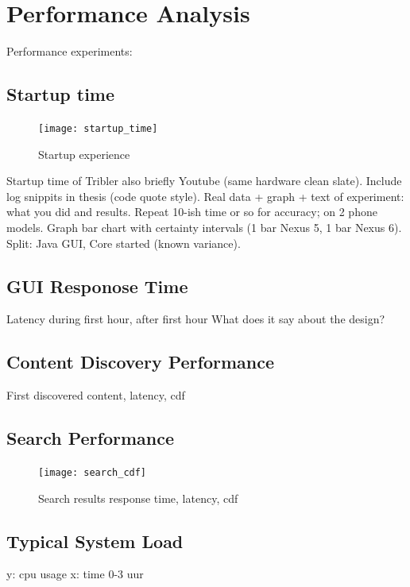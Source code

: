 \chapter{Performance Analysis}
Performance experiments:


\section{Startup time}

\begin{figure}[h]
	\centering
	\texttt{[image: startup\_time]}
	\caption{Startup experience}
	\label{fig:startup_time}
\end{figure}

Startup time of Tribler also briefly Youtube (same hardware clean slate). Include log snippits in thesis (code quote style). Real data + graph + text of experiment: what you did and results. Repeat 10-ish time or so for accuracy; on 2 phone models. Graph bar chart with certainty intervals (1 bar Nexus 5, 1 bar Nexus 6). Split: Java GUI, Core started (known variance).



\section{GUI Responose Time}
Latency during first hour, after first hour
What does it say about the design?


\section{Content Discovery Performance}
First discovered content, latency, cdf


\section{Search Performance}

\begin{figure}[h]
	\centering
	\texttt{[image: search\_cdf]}
	\caption{Search results response time, latency, cdf}
	\label{fig:search_cdf}
\end{figure}


\section{Typical System Load}
y: cpu usage
x: time 0-3 uur

